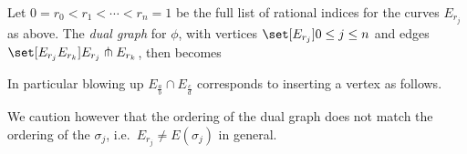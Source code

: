 \documentclass[11pt, final]{amsart}
\begin{document}
Let $0 = r_0 < r_1 < \cdots < r_n = 1$ be the full list of rational indices for the curves $E_{r_j}$ as above. The \emph{dual graph} for $\phi$, with vertices $\set[E_{r_j}]{0\le j \le n}$ and edges $\set[E_{r_j}E_{r_k}]{E_{r_j} \pitchfork E_{r_k}}$, then becomes 
\begin{center}
\end{center}
In particular blowing up $E_{\frac ab} \cap E_{\frac cd}$ corresponds to inserting a vertex as follows.
\begin{center}
\end{center}
We caution however that the ordering of the dual graph does not match the ordering of the $\sigma_j$, i.e.\ $E_{r_j} \ne E(\sigma_j)$ in general.


%
\end{document}

